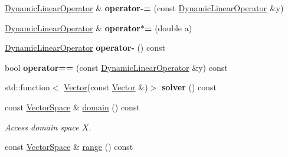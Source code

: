 \begin{DoxyCompactItemize}
\item 
\hypertarget{classSpacy_1_1DynamicLinearOperator_a8a7283da8c551442f8e4e0372e088f41}{}\hyperlink{classSpacy_1_1DynamicLinearOperator}{Dynamic\+Linear\+Operator} \& {\bfseries operator-\/=} (const \hyperlink{classSpacy_1_1DynamicLinearOperator}{Dynamic\+Linear\+Operator} \&y)\label{classSpacy_1_1DynamicLinearOperator_a8a7283da8c551442f8e4e0372e088f41}

\item 
\hypertarget{classSpacy_1_1DynamicLinearOperator_ae8fc6f0856bc0218b53a7371cf2928f4}{}\hyperlink{classSpacy_1_1DynamicLinearOperator}{Dynamic\+Linear\+Operator} \& {\bfseries operator$\ast$=} (double a)\label{classSpacy_1_1DynamicLinearOperator_ae8fc6f0856bc0218b53a7371cf2928f4}

\item 
\hypertarget{classSpacy_1_1DynamicLinearOperator_afd842124db19f3bb9716ca4bb12a4867}{}\hyperlink{classSpacy_1_1DynamicLinearOperator}{Dynamic\+Linear\+Operator} {\bfseries operator-\/} () const \label{classSpacy_1_1DynamicLinearOperator_afd842124db19f3bb9716ca4bb12a4867}

\item 
\hypertarget{classSpacy_1_1DynamicLinearOperator_a8f252aa5f13f636533d6f4337c4116d0}{}bool {\bfseries operator==} (const \hyperlink{classSpacy_1_1DynamicLinearOperator}{Dynamic\+Linear\+Operator} \&y) const \label{classSpacy_1_1DynamicLinearOperator_a8f252aa5f13f636533d6f4337c4116d0}

\item 
\hypertarget{classSpacy_1_1DynamicLinearOperator_acdd0c580689445355892fa2e78694f76}{}std\+::function$<$ \hyperlink{classSpacy_1_1Vector}{Vector}(const \hyperlink{classSpacy_1_1Vector}{Vector} \&)$>$ {\bfseries solver} () const \label{classSpacy_1_1DynamicLinearOperator_acdd0c580689445355892fa2e78694f76}

\item 
\hypertarget{classSpacy_1_1DynamicLinearOperator_aa5882565e1a88f20a16f7e7a27df3015}{}const \hyperlink{classSpacy_1_1VectorSpace}{Vector\+Space} \& \hyperlink{classSpacy_1_1DynamicLinearOperator_aa5882565e1a88f20a16f7e7a27df3015}{domain} () const \label{classSpacy_1_1DynamicLinearOperator_aa5882565e1a88f20a16f7e7a27df3015}

\begin{DoxyCompactList}\small\item\em Access domain space $X$. \end{DoxyCompactList}\item 
\hypertarget{classSpacy_1_1DynamicLinearOperator_a08e5f8bd41f1112ae349e50dd773b9ea}{}const \hyperlink{classSpacy_1_1VectorSpace}{Vector\+Space} \& \hyperlink{classSpacy_1_1DynamicLinearOperator_a08e5f8bd41f1112ae349e50dd773b9ea}{range} () const \label{classSpacy_1_1DynamicLinearOperator_a08e5f8bd41f1112ae349e50dd773b9ea}


\end{DoxyCompactItemize}
